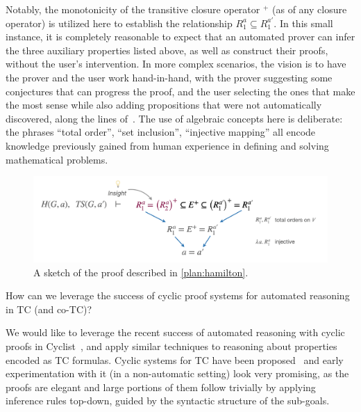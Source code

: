 \begin{example}
Notably, the monotonicity of the transitive closure operator $^+$ (as of any closure operator) is utilized here to establish the relationship $R_1^a \subseteq R_1^{a'}$.
In this small instance, it is completely reasonable to expect that an automated prover can infer the three auxiliary properties listed above, as well as construct their proofs, without the user's intervention.
In more complex scenarios, the vision is to have the prover and the user work hand-in-hand, with the prover suggesting some conjectures that can progress the proof, and the user selecting the ones that make the most sense while also adding propositions that were not automatically discovered, along the lines of~\cite{PLDI2016:Padon}.
The use of algebraic concepts here is deliberate: the phrases ``total order'', ``set inclusion'', ``injective mapping'' all encode knowledge previously gained from human experience in defining and solving mathematical problems.
\end{example}


\begin{figure}
\begin{center}
\includegraphics[width=.8\textwidth]{img/topological-and-hamilton-proof-sketch.png}
\end{center}
\vspace{-2em}
\caption{A sketch of the proof described in \autoref{plan:hamilton}.}
\label{plan:hamilton-proof}
\end{figure}


\begin{researchquestion}How can we leverage the success of cyclic proof systems for automated reasoning in TC (and co-TC)?
\end{researchquestion}

We would like to leverage the recent success of automated reasoning with cyclic proofs in Cyclist~\cite{CPP2017:Rowe}, and apply similar techniques to reasoning about properties encoded as TC formulas.
Cyclic systems for TC have been proposed~\cite{TOCL2020:Cohen,IJCAR2020:Cohen} and early experimentation with it (in a non-automatic setting) look very promising, as the proofs are elegant and large portions of them follow trivially by applying inference rules top-down, guided by the syntactic structure of the sub-goals.

